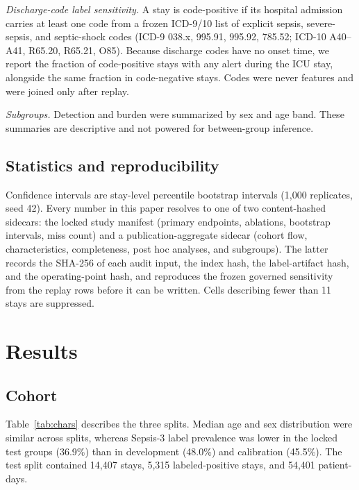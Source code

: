 \documentclass[journal]{IEEEtran}
\begin{document}
\emph{Discharge-code label sensitivity.} A stay is code-positive if its
hospital admission carries at least one code from a frozen ICD-9/10 list of
explicit sepsis, severe-sepsis, and septic-shock codes (ICD-9 038.x, 995.91,
995.92, 785.52; ICD-10 A40--A41, R65.20, R65.21, O85). Because discharge
codes have no onset time, we report the fraction of code-positive stays with
any alert during the ICU stay, alongside the same fraction in code-negative
stays. Codes were never features and were joined only after replay.

\emph{Subgroups.} Detection and burden were summarized by sex and age band.
These summaries are descriptive and not powered for between-group inference.

\subsection{Statistics and reproducibility}

Confidence intervals are stay-level percentile bootstrap intervals (1,000
replicates, seed 42). Every number in this paper resolves to one of two
content-hashed sidecars: the locked study manifest (primary endpoints,
ablations, bootstrap intervals, miss count) and a publication-aggregate
sidecar (cohort flow, characteristics, completeness, post hoc analyses, and
subgroups). The latter records the SHA-256 of each audit input, the index
hash, the label-artifact hash, and the operating-point hash, and reproduces
the frozen governed sensitivity from the replay rows before it can be
written. Cells describing fewer than 11 stays are suppressed.

\section{Results}

\subsection{Cohort}

Table~\ref{tab:chars} describes the three splits. Median age and sex
distribution were similar across splits, whereas Sepsis-3 label prevalence
was lower in the locked test groups (36.9\%) than in development (48.0\%)
and calibration (45.5\%). The test split contained 14,407 stays, 5,315
labeled-positive stays, and 54,401 patient-days.
\end{document}
